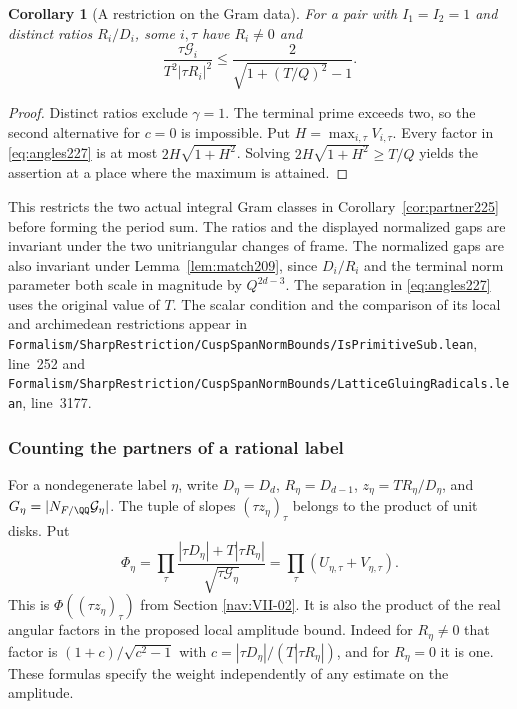 \documentclass[a4paper,11pt]{article}
\newtheorem{corollary}[proposition]{Corollary}
\theoremstyle{definition}
\theoremstyle{remark}
\newcommand{\srcloc}[2]{{\small\nolinkurl{#1.lean}}, line~#2}
\numberwithin{equation}{section}
\begin{document}
\begin{corollary}[A restriction on the Gram data]
\label{cor:gap227}
For a pair with \(I_1=I_2=1\) and distinct ratios
\(R_i/D_i\), some \(i,\tau\) have \(R_i\ne0\) and
\[
 \frac{\tau\mathcal G_i}{T^2|\tau R_i|^2}
          \le \frac{2}{\sqrt{1+(T/Q)^2}-1}.
\]
\end{corollary}
\begin{proof}
Distinct ratios exclude \(\gamma=1\). The terminal prime
exceeds two, so the second alternative for \(c=0\) is
impossible. Put \(H=\max_{i,\tau}V_{i,\tau}\). Every factor
in \eqref{eq:angles227} is at most \(2H\sqrt{1+H^2}\).
Solving \(2H\sqrt{1+H^2}\ge T/Q\) yields the assertion
at a place where the maximum is attained.
\end{proof}

This restricts the two actual integral Gram classes in
Corollary~\ref{cor:partner225} before forming the period sum.
The ratios and the displayed normalized gaps are invariant
under the two unitriangular changes of frame. The normalized
gaps are also invariant under Lemma~\ref{lem:match209},
since \(D_i/R_i\) and the terminal norm parameter both
scale in magnitude by \(Q^{2d-3}\). The separation in
\eqref{eq:angles227} uses the original value of \(T\).
The scalar condition and the comparison of its local and
archimedean restrictions appear in
\srcloc{Formalism/SharpRestriction/CuspSpanNormBounds/IsPrimitiveSub}{252}
and \srcloc{Formalism/SharpRestriction/CuspSpanNormBounds/LatticeGluingRadicals}{3177}.

\subsubsection{Counting the partners of a rational label}\label{nav:IX-17}
\label{sub:partners230}

For a nondegenerate label \(\eta\), write \(D_\eta=D_d\),
\(R_\eta=D_{d-1}\), \(z_\eta=TR_\eta/D_\eta\), and
\(G_\eta=|N_{F/\QQ}\mathcal G_\eta|\). The tuple of slopes
\((\tau z_\eta)_\tau\) belongs to the product of unit disks. Put
\[
 \Phi_\eta=\prod_\tau
    \frac{|\tau D_\eta|+T|\tau R_\eta|}{\sqrt{\tau\mathcal G_\eta}}
          =\prod_\tau(U_{\eta,\tau}+V_{\eta,\tau}).
\]
This is \(\Phi((\tau z_\eta)_\tau)\) from
Section
\ref{nav:VII-02}.
It is also the product of the real angular factors in the proposed
local amplitude bound. Indeed for \(R_\eta\ne0\) that factor is
\((1+c)/\sqrt{c^2-1}\) with \(c=|\tau D_\eta|/(T|\tau R_\eta|)\),
and for \(R_\eta=0\) it is one. These formulas specify the
weight independently of any estimate on the amplitude.
\end{document}
